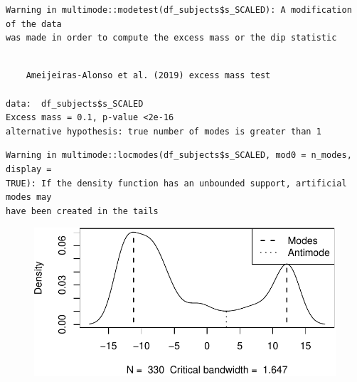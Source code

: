 \documentclass[
  letterpaper,
  DIV=11,
  numbers=noendperiod]{scrreprt}
\newenvironment{Shaded}{\begin{snugshade}}{\end{snugshade}}
\newcommand{\AttributeTok}[1]{\textcolor[rgb]{0.40,0.45,0.13}{#1}}
\newcommand{\CommentTok}[1]{\textcolor[rgb]{0.37,0.37,0.37}{#1}}
\newcommand{\ConstantTok}[1]{\textcolor[rgb]{0.56,0.35,0.01}{#1}}
\newcommand{\DecValTok}[1]{\textcolor[rgb]{0.68,0.00,0.00}{#1}}
\newcommand{\FunctionTok}[1]{\textcolor[rgb]{0.28,0.35,0.67}{#1}}
\newcommand{\NormalTok}[1]{\textcolor[rgb]{0.00,0.23,0.31}{#1}}
\newcommand{\OtherTok}[1]{\textcolor[rgb]{0.00,0.23,0.31}{#1}}
\newcommand{\SpecialCharTok}[1]{\textcolor[rgb]{0.37,0.37,0.37}{#1}}
\begin{document}
\begin{verbatim}
Warning in multimode::modetest(df_subjects$s_SCALED): A modification of the data
was made in order to compute the excess mass or the dip statistic
\end{verbatim}

\begin{verbatim}

    Ameijeiras-Alonso et al. (2019) excess mass test

data:  df_subjects$s_SCALED
Excess mass = 0.1, p-value <2e-16
alternative hypothesis: true number of modes is greater than 1
\end{verbatim}

\begin{Shaded}
\end{Shaded}

\begin{verbatim}
Warning in multimode::locmodes(df_subjects$s_SCALED, mod0 = n_modes, display =
TRUE): If the density function has an unbounded support, artificial modes may
have been created in the tails
\end{verbatim}

\begin{figure}[H]

{\centering \includegraphics{analysis/SGC3A/3_sgc3A_description_files/figure-pdf/CHECK-SUBJ-SCALED-1.pdf}

}

\end{figure}
\end{document}
